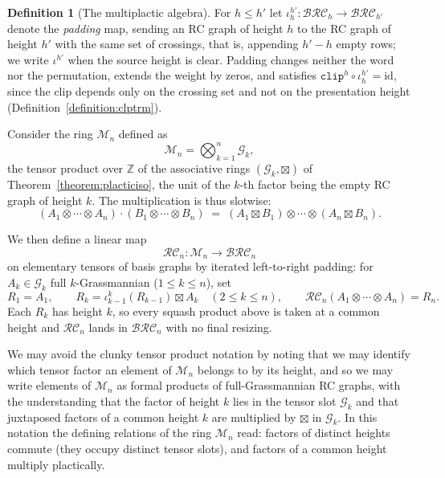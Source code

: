 \documentclass{amsart}
\theoremstyle{definition}
\newtheorem{definition}[lemma]{Definition}
\theoremstyle{remark}
\numberwithin{equation}{subsection}
\newcommand{\grass}{\mathcal{G}}
\newcommand{\hr}{\mathtt{ht}}
\newcommand{\clp}{\mathtt{clip}}
\newcommand{\BRC}{\mathcal{BRC}}
\newcommand{\RC}{\mathcal{RC}}
\begin{document}
\begin{definition}[The multiplactic algebra]
For $h\leq h'$ let $\iota_h^{h'}:\BRC_h\to\BRC_{h'}$ denote the \emph{padding} map, sending an RC graph of height $h$ to the RC graph of height $h'$ with the same set of crossings, that is, appending $h'-h$ empty rows; we write $\iota^{h'}$ when the source height is clear. Padding changes neither the word nor the permutation, extends the weight by zeros, and satisfies $\clp^{h}\circ\iota_h^{h'}=\mathrm{id}$, since the clip depends only on the crossing set and not on the presentation height (Definition~\ref{definition:clptrm}).

Consider the ring $\mathcal{M}_n$ defined as
$$\mathcal{M}_n = \bigotimes_{k=1}^n \grass_k,$$
the tensor product over $\mathbb{Z}$ of the associative rings $(\grass_k,\boxtimes)$ of Theorem~\ref{theorem:placticiso}, the unit of the $k$-th factor being the empty RC graph of height $k$. The multiplication is thus slotwise:
$$(A_1\otimes\cdots\otimes A_n)\cdot(B_1\otimes\cdots\otimes B_n) \;=\; (A_1\boxtimes B_1)\otimes\cdots\otimes(A_n\boxtimes B_n).$$

We then define a linear map
$$\RC_n:\mathcal{M}_n\to \BRC_n$$
on elementary tensors of basis graphs by iterated left-to-right padding: for $A_k\in\grass_k$ full $k$-Grassmannian ($1\leq k\leq n$), set
$$R_1=A_1,\qquad R_k=\iota_{k-1}^{k}(R_{k-1})\boxtimes A_k\quad(2\leq k\leq n),\qquad \RC_n(A_1\otimes\cdots\otimes A_n)=R_n.$$
Each $R_k$ has height $k$, so every squash product above is taken at a common height and $\RC_n$ lands in $\BRC_n$ with no final resizing.

We may avoid the clunky tensor product notation by noting that we may identify which tensor factor an element of $\mathcal{M}_n$ belongs to by its height, and so we may write elements of $\mathcal{M}_n$ as formal products of full-Grassmannian RC graphs, with the understanding that the factor of height $k$ lies in the tensor slot $\grass_k$ and that juxtaposed factors of a common height $k$ are multiplied by $\boxtimes$ in $\grass_k$. In this notation the defining relations of the ring $\mathcal{M}_n$ read: factors of distinct heights commute (they occupy distinct tensor slots), and factors of a common height multiply plactically.


\end{definition}
\end{document}
